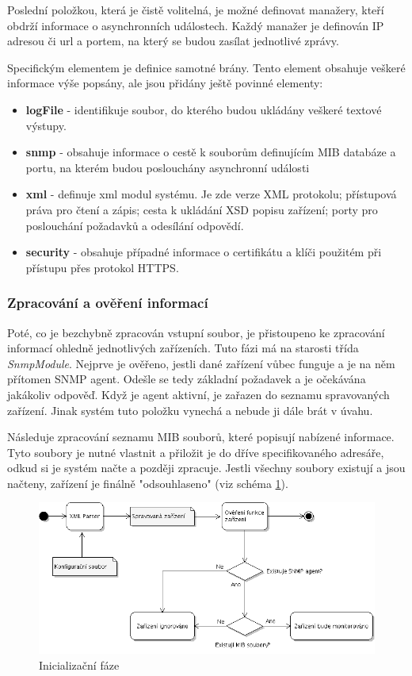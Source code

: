 Poslední položkou, která je čistě volitelná, je možné definovat manažery, kteří obdrží informace o asynchronních událostech. Každý 
manažer je definován IP adresou či url a portem, na který se budou zasílat jednotlivé zprávy.

Specifickým elementem je definice samotné brány. Tento element obsahuje veškeré informace výše popsány, ale jsou přidány ještě povinné elementy:
\begin{itemize}
	\item \textbf{logFile} - identifikuje soubor, do kterého budou ukládány veškeré textové výstupy.
	\item \textbf{snmp}    - obsahuje informace o cestě k souborům definujícím MIB databáze a portu, na kterém budou poslouchány asynchronní události
	\item \textbf{xml}     - definuje xml modul systému. Je zde verze XML protokolu; přístupová práva pro čtení a zápis; cesta k ukládání XSD popisu zařízení;
	porty pro poslouchání požadavků a odesílání odpovědí.
	\item \textbf{security} - obsahuje případné informace o certifikátu a klíči použitém při přístupu přes protokol HTTPS.
\end{itemize}

\subsubsection*{Zpracování a ověření informací}
Poté, co je bezchybně zpracován vstupní soubor, je přistoupeno ke zpracování informací ohledně jednotlivých zařízeních. Tuto fázi má
na starosti třída \textit{SnmpModule}. Nejprve je ověřeno, jestli dané zařízení vůbec funguje a je na něm přítomen SNMP agent. Odešle
se tedy základní požadavek a je očekávána jakákoliv odpověď. Když je agent aktivní, je zařazen do seznamu spravovaných zařízení. Jinak
systém tuto položku vynechá a nebude ji dále brát v úvahu. 

Následuje zpracování seznamu MIB souborů, které popisují nabízené informace. Tyto soubory je nutné vlastnit a přiložit je do dříve specifikovaného
adresáře, odkud si je systém načte a později zpracuje. Jestli všechny soubory existují a jsou načteny, zařízení je finálně "odsouhlaseno" (viz schéma
\ref{obr_impl_inicializacni_faze}).

\begin{figure}[htp]
	\begin{center}
		\includegraphics[width=15cm]{obrazky/05_inicializacni_faze.png}
		\caption{Inicializační fáze}
		\label{obr_impl_inicializacni_faze}
	\end{center}
\end{figure}

